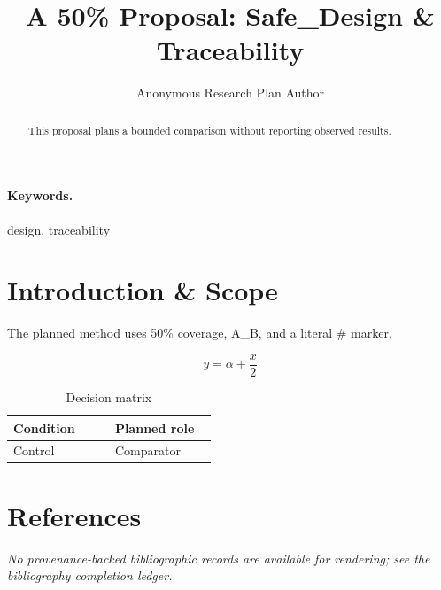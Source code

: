 \documentclass{article}
\title{A 50\% Proposal: Safe\_Design \& Traceability}
\author{Anonymous Research Plan Author}
\begin{document}
\maketitle
\begin{abstract}
This proposal plans a bounded comparison without reporting observed results.
\end{abstract}
\paragraph{Keywords.} design, traceability
\section{Introduction \& Scope}
The planned method uses 50\% coverage, A\_B, and a literal \# marker.

\begin{equation}
y = \alpha + \frac{x}{2}
\label{eq:introduction-B2}
\end{equation}

\begin{table}[htbp]
\centering
\small


\caption{Decision matrix}
\label{tab:introduction-B3}
\begin{tabular}{|p{0.45\linewidth}|p{0.45\linewidth}|}
\hline
Condition & Planned role \\\hline
Control & Comparator \\\hline
\end{tabular}
\end{table}
\section*{References}
\emph{No provenance-backed bibliographic records are available for rendering; see the bibliography completion ledger.}
\end{document}
